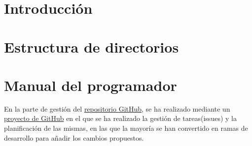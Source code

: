 
\section{Introducción}

\section{Estructura de directorios}

\section{Manual del programador}

En la parte de gestión del \href{https://github.com/CesarRodrigu/GII-24.19-contramedidas-IoT-mediante-reinforcement-learning}{repositorio GitHub}, se ha realizado mediante un \href{https://github.com/users/CesarRodrigu/projects/6}{proyecto de GitHub} en el que se ha realizado la gestión de tareas(issues) y la planificación de las mismas, en las que la mayoría se han convertido en ramas de desarrollo para añadir los cambios propuestos.
